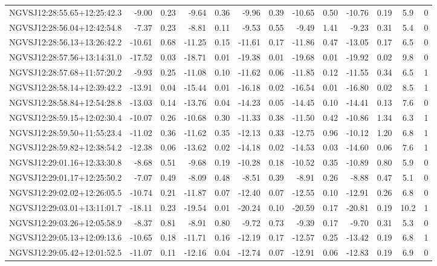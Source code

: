 \begin{tabular}{lrrrrrrrrrrcc}
NGVSJ12:28:55.65+12:25:42.3 & -9.00 & 0.23 & -9.64 & 0.36 & -9.96 & 0.39 & -10.65 & 0.50 & -10.76 & 0.19 & 5.9 & 0 \\
NGVSJ12:28:56.04+12:42:54.8 & -7.37 & 0.23 & -8.81 & 0.11 & -9.53 & 0.55 & -9.49 & 1.41 & -9.23 & 0.31 & 5.4 & 0 \\
NGVSJ12:28:56.13+13:26:42.2 & -10.61 & 0.68 & -11.25 & 0.15 & -11.61 & 0.17 & -11.86 & 0.47 & -13.05 & 0.17 & 6.5 & 0 \\
NGVSJ12:28:57.56+13:14:31.0 & -17.52 & 0.03 & -18.71 & 0.01 & -19.38 & 0.01 & -19.68 & 0.01 & -19.92 & 0.02 & 9.8 & 0 \\
NGVSJ12:28:57.68+11:57:20.2 & -9.93 & 0.25 & -11.08 & 0.10 & -11.62 & 0.06 & -11.85 & 0.12 & -11.55 & 0.34 & 6.5 & 1 \\
NGVSJ12:28:58.14+12:39:42.2 & -13.91 & 0.04 & -15.44 & 0.01 & -16.18 & 0.02 & -16.54 & 0.01 & -16.80 & 0.02 & 8.5 & 1 \\
NGVSJ12:28:58.84+12:54:28.8 & -13.03 & 0.14 & -13.76 & 0.04 & -14.23 & 0.05 & -14.45 & 0.10 & -14.41 & 0.13 & 7.6 & 0 \\
NGVSJ12:28:59.15+12:02:30.4 & -10.07 & 0.26 & -10.68 & 0.30 & -11.33 & 0.38 & -11.50 & 0.42 & -10.86 & 1.34 & 6.3 & 1 \\
NGVSJ12:28:59.50+11:55:23.4 & -11.02 & 0.36 & -11.62 & 0.35 & -12.13 & 0.33 & -12.75 & 0.96 & -10.12 & 1.20 & 6.8 & 1 \\
NGVSJ12:28:59.82+12:38:54.2 & -12.38 & 0.06 & -13.62 & 0.02 & -14.18 & 0.02 & -14.53 & 0.03 & -14.60 & 0.06 & 7.6 & 1 \\
NGVSJ12:29:01.16+12:33:30.8 & -8.68 & 0.51 & -9.68 & 0.19 & -10.28 & 0.18 & -10.52 & 0.35 & -10.89 & 0.80 & 5.9 & 0 \\
NGVSJ12:29:01.17+12:25:50.2 & -7.07 & 0.49 & -8.09 & 0.48 & -8.51 & 0.39 & -8.91 & 0.26 & -8.88 & 0.47 & 5.1 & 0 \\
NGVSJ12:29:02.02+12:26:05.5 & -10.74 & 0.21 & -11.87 & 0.07 & -12.40 & 0.07 & -12.55 & 0.10 & -12.91 & 0.26 & 6.8 & 0 \\
NGVSJ12:29:03.01+13:11:01.7 & -18.11 & 0.23 & -19.54 & 0.01 & -20.24 & 0.10 & -20.59 & 0.17 & -20.81 & 0.19 & 10.2 & 1 \\
NGVSJ12:29:03.26+12:05:58.9 & -8.37 & 0.81 & -8.91 & 0.80 & -9.72 & 0.73 & -9.39 & 0.17 & -9.70 & 0.31 & 5.3 & 0 \\
NGVSJ12:29:05.13+12:09:13.6 & -10.65 & 0.18 & -11.71 & 0.16 & -12.19 & 0.17 & -12.57 & 0.25 & -13.42 & 0.19 & 6.8 & 1 \\
NGVSJ12:29:05.42+12:01:52.5 & -11.07 & 0.11 & -12.16 & 0.04 & -12.74 & 0.07 & -12.91 & 0.06 & -12.83 & 0.19 & 6.9 & 0 \\

\end{tabular}
